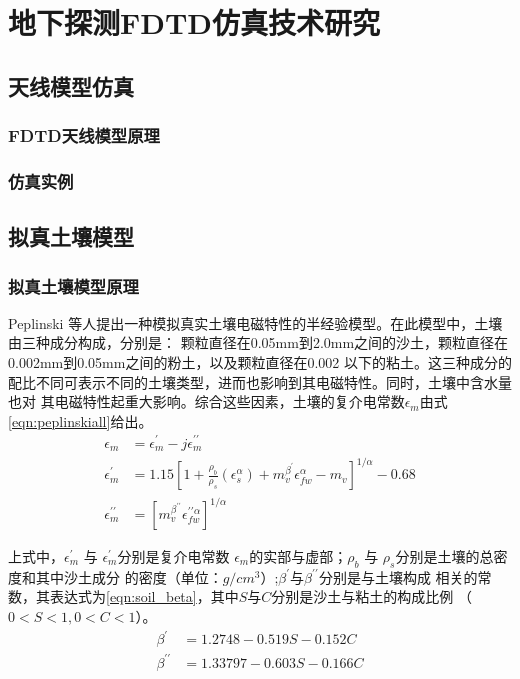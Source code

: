 \chapter{地下探测FDTD仿真技术研究}
\section{天线模型仿真}
\subsection{FDTD天线模型原理}
\subsection{仿真实例}
\section{拟真土壤模型}
\subsection{拟真土壤模型原理}
Peplinski 等人提出一种模拟真实土壤电磁特性的半经验模型。在此模型中，土壤由三种成分构成，分别是：
颗粒直径在0.05mm到2.0mm之间的沙土，颗粒直径在0.002mm到0.05mm之间的粉土，以及颗粒直径在0.002
以下的粘土。这三种成分的配比不同可表示不同的土壤类型，进而也影响到其电磁特性。同时，土壤中含水量也对
其电磁特性起重大影响。综合这些因素，土壤的复介电常数$\epsilon_m$由式\ref{eqn:peplinskiall}给出。
\begin{equation} 
	\label{eqn:peplinskiall} 
	\begin{aligned} \epsilon_{m} &=\epsilon_{m}^{\prime}-j \epsilon_{m}^{\prime \prime} \\ 
\epsilon_{m}^{\prime} &=1.15 \left[1+\frac{\rho_{b}}{\rho_{s}}\left(\epsilon_{s}^{\alpha}\right)+m_{v}^{\beta^{\prime}} \epsilon_{f w}^{\alpha}-m_{v}\right]^{1 / \alpha} - 0.68\\ 
\epsilon_{m}^{\prime \prime} &=\left[m_{v}^{\beta^{\prime \prime}} \epsilon_{f w}^{\prime \prime \alpha}\right]^{1 / \alpha} \end{aligned}
\end{equation}

上式中，$\epsilon_{m}^{\prime}$ 与 $\epsilon_{m}^{\prime}$分别是复介电常数
$\epsilon_m$的实部与虚部；$\rho_{b}$ 与 $\rho_{s}$分别是土壤的总密度和其中沙土成分
的密度（单位：$g/cm^3$）;$\beta^\prime$与$\beta^{\prime \prime}$分别是与土壤构成
相关的常数，其表达式为\ref{eqn:soil_beta}，其中$S$与$C$分别是沙土与粘土的构成比例
（$0<S<1, 0<C<1$）。
\begin{equation} 
	\label{eqn:soil_beta}
	\begin{aligned}
\beta^{\prime}&=1.2748-0.519 S-0.152 C \\
\beta^{\prime \prime}&=1.33797-0.603 S-0.166 C
	\end{aligned}
\end{equation}

